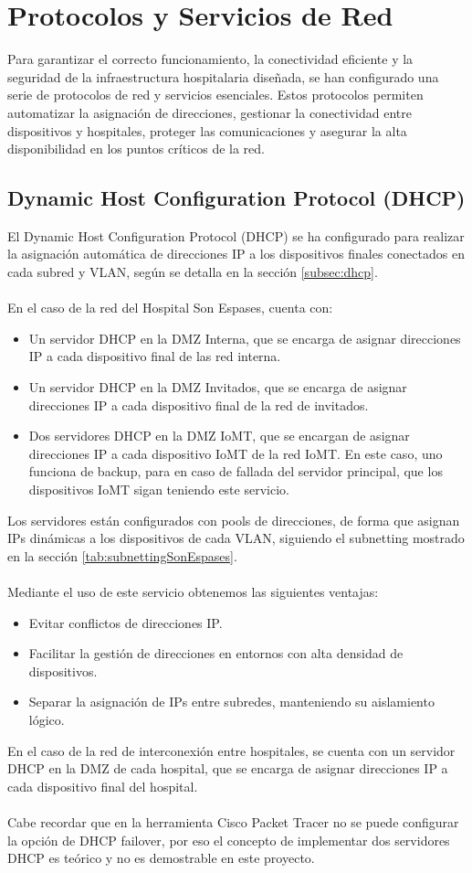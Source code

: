 \section{Protocolos y Servicios de Red}
Para garantizar el correcto funcionamiento, la conectividad eficiente y la seguridad de la infraestructura hospitalaria diseñada, se han configurado una serie de protocolos 
de red y servicios esenciales. Estos protocolos permiten automatizar la asignación de direcciones, gestionar la conectividad entre dispositivos y hospitales, proteger las 
comunicaciones y asegurar la alta disponibilidad en los puntos críticos de la red.

\subsection{Dynamic Host Configuration Protocol (DHCP)}
El Dynamic Host Configuration Protocol (DHCP) se ha configurado para realizar la asignación automática de direcciones IP a los dispositivos finales conectados en cada subred y VLAN, según se detalla en la sección \ref{subsec:dhcp}.
\\ \\
En el caso de la red del Hospital Son Espases, cuenta con:
\begin{itemize}
    \item Un servidor DHCP en la DMZ Interna, que se encarga de asignar direcciones IP a cada dispositivo final de las red interna.
    \item Un servidor DHCP en la DMZ Invitados, que se encarga de asignar direcciones IP a cada dispositivo final de la red de invitados.
    \item Dos servidores DHCP en la DMZ IoMT, que se encargan de asignar direcciones IP a cada dispositivo IoMT de la red IoMT. En este caso, uno funciona de backup, para en caso de fallada del servidor principal, que los dispositivos IoMT sigan teniendo este servicio.
\end{itemize}
Los servidores están configurados con pools de direcciones, de forma que asignan IPs dinámicas a los dispositivos de cada VLAN, siguiendo el subnetting mostrado en la sección \ref{tab:subnettingSonEspases}.
\\ \\
Mediante el uso de este servicio obtenemos las siguientes ventajas:
\begin{itemize}
    \item Evitar conflictos de direcciones IP.
    \item Facilitar la gestión de direcciones en entornos con alta densidad de dispositivos.
    \item Separar la asignación de IPs entre subredes, manteniendo su aislamiento lógico.
\end{itemize}
En el caso de la red de interconexión entre hospitales, se cuenta con un servidor DHCP en la DMZ de cada hospital, que se encarga de asignar direcciones IP a cada dispositivo final del hospital. \\ \\
Cabe recordar que en la herramienta Cisco Packet Tracer no se puede configurar la opción de DHCP failover, por eso el concepto de implementar dos servidores DHCP es teórico y no es demostrable en este proyecto.

